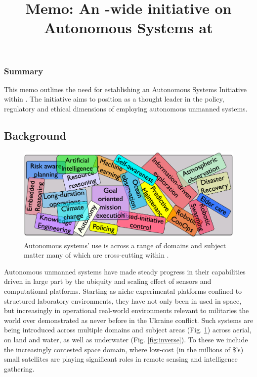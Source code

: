 \documentclass[11pt,letterpaper]{article}
\title{Memo: An \auke-wide initiative on Autonomous Systems at \org}
\author{%
  }
\begin{document}
\maketitle{}

\subsubsection{Summary}

This memo outlines the need for establishing an Autonomous Systems
Initiative within \orge. The initiative aims to position \org as a
thought leader in the policy, regulatory and ethical dimensions of
employing autonomous unmanned systems.

\subsection{Background}

\begin{figure}
  \vspace{-0.5cm}
  \centering
  \includegraphics[scale=0.06]{fig/word-bag.jpg}
  \caption{Autonomous systems' use is across a range of domains and
    subject matter many of which are cross-cutting within \orge.}
 \label{fig:topics}
\end{figure}

Autonomous unmanned systems have made steady progress in their
capabilities driven in large part by the ubiquity and scaling effect
of sensors and computational platforms. Starting as niche experimental
platforms confined to structured laboratory environments, they have
not only been in used in space, but increasingly in operational
real-world environments relevant to militaries the world over
demonstrated as never before in the Ukraine conflict. Such systems are
being introduced across multiple domains and subject areas
(Fig. \ref{fig:topics}) across aerial, on land and water, as well as
underwater (Fig. \ref{fig:inverse}). To these we include the
increasingly contested space domain, where low-cost (in the millions
of \$'s) small satellites are playing significant roles in remote
sensing and intelligence gathering.
\end{document}

